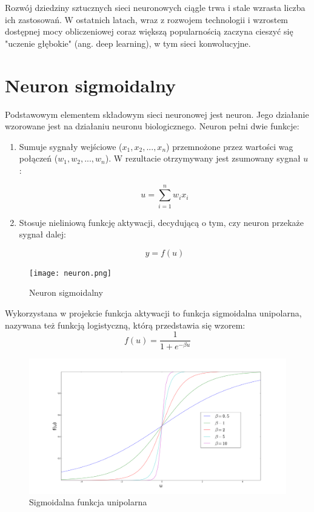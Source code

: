 Rozwój dziedziny sztucznych sieci neuronowych ciągle trwa i stale wzrasta liczba ich zastosowań. W ostatnich latach, wraz z rozwojem technologii i wzrostem dostępnej mocy obliczeniowej coraz większą popularnością zaczyna cieszyć się "uczenie głębokie" (ang. deep learning), w tym sieci konwolucyjne.


\section{Neuron sigmoidalny}
\label{Sec:ThSig}


Podstawowym elementem składowym sieci neuronowej jest neuron. Jego działanie wzorowane jest na działaniu neuronu biologicznego. Neuron pełni dwie funkcje:

\begin{enumerate}
\item Sumuje sygnały wejściowe ($x_1, x_2, ..., x_n$) przemnożone przez wartości wag połączeń ($w_1, w_2, ..., w_n$). W rezultacie otrzymywany jest zsumowany sygnał $u$:

$$u=\sum_{i=1}^{n} w_ix_i$$

\item Stosuje nieliniową funkcję aktywacji, decydującą o tym, czy neuron przekaże sygnał dalej:

$$y=f(u)$$

\end{enumerate}

\begin{figure}
\texttt{[image: neuron.png]}
\caption{Neuron sigmoidalny}
\label{fig:neuron}
\end{figure}

Wykorzystana w projekcie funkcja aktywacji to funkcja sigmoidalna unipolarna, nazywana też funkcją logistyczną, którą przedstawia się wzorem: $$f(u)=\frac{1}{1+e^{-\beta u}}$$ 

\begin{figure}[H]
\includegraphics[width=\textwidth]{aktywacja.png}
\caption{Sigmoidalna funkcja unipolarna}
\label{fig:aktywacja}
\end{figure}

